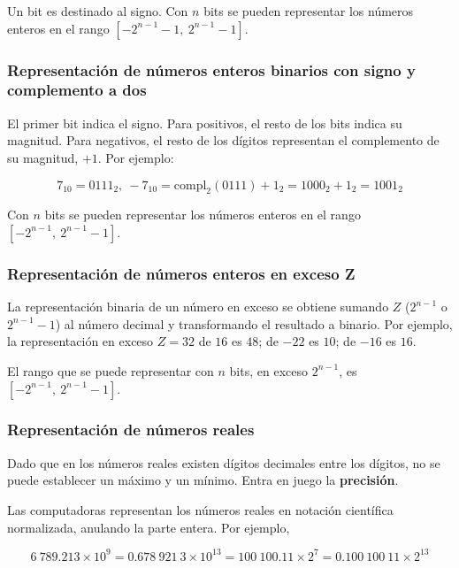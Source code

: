 \documentclass{article}
\begin{document}
Un bit es destinado al signo. Con $n$ bits se pueden representar los números
enteros en el rango $[-2^{n-1}-1,\ 2^{n-1}-1]$.

\subsubsection{Representación de números enteros binarios con signo y 
complemento a dos}

El primer bit indica el signo. Para positivos, el resto de los bits indica su
magnitud. Para negativos, el resto de los dígitos representan el complemento de
su magnitud, $+1$. Por ejemplo:

\begin{equation*}
    7_{10} = 0111_{2},\ -7_{10} = \text{compl}_{2} \left(0111\right) + 1_{2}
    = 1000_{2} + 1_{2} = 1001_{2}
\end{equation*}

Con $n$ bits se pueden representar los números enteros en el rango
$[-2^{n-1},\ 2^{n-1}-1]$.

\subsubsection{Representación de números enteros en exceso Z}

La representación binaria de un número en exceso se obtiene sumando $Z$
($2^{n-1}$ o $2^{n-1}-1$) al número decimal y transformando el resultado a
binario. Por ejemplo, la representación en exceso $Z=32$ de $16$ es $48$; de 
$-22$ es $10$; de $-16$ es $16$.

El rango que se puede representar con $n$ bits, en exceso $2^{n-1}$, es
$[-2^{n-1},\ 2^{n-1}-1]$.

\subsubsection{Representación de números reales}

Dado que en los números reales existen dígitos decimales entre los dígitos, no
se puede establecer un máximo y un mínimo. Entra en juego la \textbf{precisión}.

Las computadoras representan los números reales en notación científica 
normalizada, anulando la parte entera. Por ejemplo, 

\begin{equation*}
    6\ 789.213\times10^9 = 0.678\ 921\ 3\times10^{13} = 
    100\ 100.11\times2^7 = 0.100\ 100\ 11\times2^{13}
\end{equation*}
\end{document}
